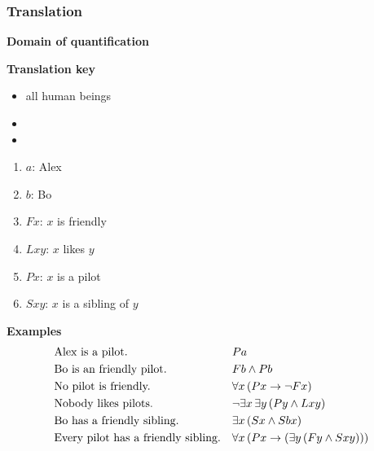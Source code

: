 \documentclass[fleqn,10pt,serif,xcolor=svgnames,xcolor=table,aspectratio=169,handout]{beamer}
\begin{document}
\begin{frame}
  \frametitle{Translation}

  \begin{minipage}{0.3\linewidth}
    \textbf{Domain of quantification}
  \end{minipage}
  \hfill
  \begin{minipage}{0.65\linewidth}
      \textbf{Translation key}
\end{minipage}

\begin{minipage}{0.3\linewidth}
  \begin{itemize}
    \item[] all human beings
    \item[]
    \item[]
  \end{itemize}
  \end{minipage}
  \hfill
  \begin{minipage}{0.65\linewidth}
    \begin{multicols}{2}
    \begin{enumerate}
      \item[] $a$: Alex
      \item[] $b$: Bo
      \item[] $Fx$: $x$ is friendly
      \item[] $Lxy$: $x$ likes $y$
      \item[] $Px$: $x$ is a pilot
      \item[] $Sxy$: $x$ is a sibling of $y$
    \end{enumerate}
  \end{multicols}
\end{minipage}

\bigskip
\bigskip

\textbf{Examples}
  \begin{align*}
    & \text{Alex is a pilot.}
    && Pa
    \\
    & \text{Bo is an friendly pilot.}
    && Fb \wedge Pb
    \\
    & \text{No pilot is friendly.}
    && \forall x \thinspace (Px \rightarrow \neg Fx)
    \\
    & \text{Nobody likes pilots.}
    && \neg \exists x \thinspace \exists y \thinspace (Py \wedge Lxy)
    \\
    & \text{Bo has a friendly sibling.}
    && \exists x \thinspace (Sx \wedge Sbx)
    \\
    & \text{Every pilot has a friendly sibling.}
    && \forall x \thinspace (Px \rightarrow (\exists y \thinspace (Fy \wedge Sxy)))
  \end{align*}
\end{frame}
\end{document}

